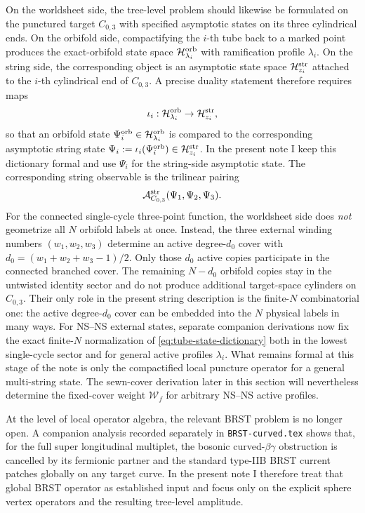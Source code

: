 \documentclass[11pt]{article}
\newcommand{\mc}[1]{\mathcal{#1}}
\begin{document}
On the worldsheet side, the tree-level problem should likewise be formulated on the punctured target $C_{0,3}$ with specified asymptotic states on its three cylindrical ends. On the orbifold side, compactifying the $i$-th tube back to a marked point produces the exact-orbifold state space $\mc H^{\rm orb}_{\lambda_i}$ with ramification profile $\lambda_i$. On the string side, the corresponding object is an asymptotic state space $\mc H^{\rm str}_{z_i}$ attached to the $i$-th cylindrical end of $C_{0,3}$. A precise duality statement therefore requires maps
\begin{equation}\label{eq:tube-state-dictionary}
\iota_i:\mc H^{\rm orb}_{\lambda_i}\to \mc H^{\rm str}_{z_i},
\end{equation}
so that an orbifold state $\Psi_i^{\rm orb}\in \mc H^{\rm orb}_{\lambda_i}$ is compared to the corresponding asymptotic string state $\Psi_i:=\iota_i(\Psi_i^{\rm orb})\in \mc H^{\rm str}_{z_i}$. In the present note I keep this dictionary formal and use $\Psi_i$ for the string-side asymptotic state. The corresponding string observable is the trilinear pairing
\begin{equation}\label{eq:pair-of-pants-amplitude}
\mc A^{\rm str}_{C_{0,3}}(\Psi_1,\Psi_2,\Psi_3).
\end{equation}
For the connected single-cycle three-point function, the worldsheet side does \emph{not} geometrize all $N$ orbifold labels at once. Instead, the three external winding numbers $(w_1,w_2,w_3)$ determine an active degree-$d_0$ cover with $d_0=(w_1+w_2+w_3-1)/2$. Only those $d_0$ active copies participate in the connected branched cover. The remaining $N-d_0$ orbifold copies stay in the untwisted identity sector and do not produce additional target-space cylinders on $C_{0,3}$. Their only role in the present string description is the finite-$N$ combinatorial one: the active degree-$d_0$ cover can be embedded into the $N$ physical labels in many ways.
For NS--NS external states, separate companion derivations now fix the exact finite-$N$ normalization of \eqref{eq:tube-state-dictionary} both in the lowest single-cycle sector and for general active profiles $\lambda_i$. What remains formal at this stage of the note is only the compactified local puncture operator for a general multi-string state. The sewn-cover derivation later in this section will nevertheless determine the fixed-cover weight $\mc W_f$ for arbitrary NS--NS active profiles.

At the level of local operator algebra, the relevant BRST problem is no longer open. A companion analysis recorded separately in \texttt{BRST-curved.tex} shows that, for the full super longitudinal multiplet, the bosonic curved-$\beta\gamma$ obstruction is cancelled by its fermionic partner and the standard type-IIB BRST current patches globally on any target curve. In the present note I therefore treat that global BRST operator as established input and focus only on the explicit sphere vertex operators and the resulting tree-level amplitude.
\end{document}
